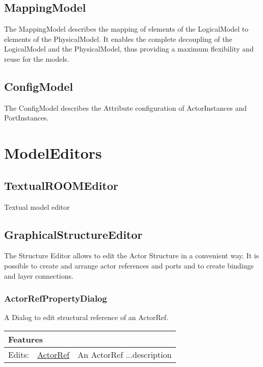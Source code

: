 		
		\subsection{MappingModel}
		The MappingModel describes the mapping of elements of the LogicalModel to elements of the PhysicalModel. It enables the complete decoupling of the LogicalModel and the PhysicalModel, thus providing a maximum flexibility and reuse for the models.
	
		
		\subsection{ConfigModel}
		The ConfigModel describes the Attribute configuration of ActorInstances and PortInstances. 
	
		
\section{ModelEditors}
	
		\subsection{TextualROOMEditor}
		Textual model editor
	
		
		\subsection{GraphicalStructureEditor}
		The Structure Editor allows to edit the Actor Structure in a convenient way. It is possible to create and arrange actor references and ports and to create bindings and layer connections.
	
		
		
		\subsubsection{ActorRefPropertyDialog}
			\hypertarget{ref:ActorRefPropertyDialog}{}
			
			
					A Dialog to edit structural reference of an ActorRef.
			
			
			\vspace{\baselineskip}
			\begingroup
			\renewcommand{\arraystretch}{1.8} %
			\parbox{\textwidth}{
			\begin{longtable}{l l p{}}
				\multicolumn{2}{l}{\textbf{\large Features}} & \\
				\hline
			Edits: & \tabitem \hyperlink{ref:ActorRef}{ActorRef}  & An ActorRef ...description\\
			\hline
			\end{longtable}	
			}
			\endgroup
			\vspace{\baselineskip}
			

